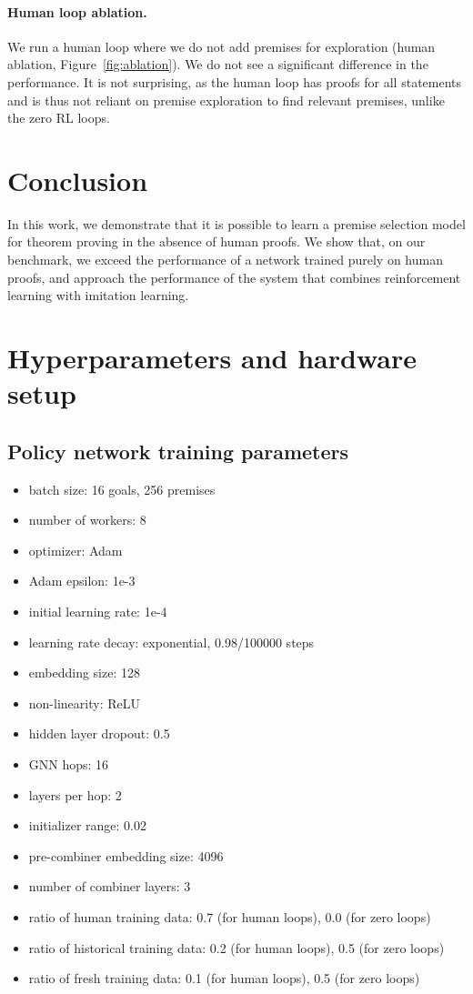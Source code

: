 \documentclass{article}
\begin{document}
\vspace{-2mm}
\paragraph{Human loop ablation.}
We run a human loop where we do not add premises for exploration 
(human ablation, Figure~\ref{fig:ablation}).
We do not see a significant difference in the performance.
It is not surprising, as the human loop has proofs for all statements and is thus not reliant on premise exploration to find relevant premises, unlike the zero RL loops.


\section{Conclusion}
In this work, we demonstrate that it is possible to learn a premise selection model for theorem proving in the absence of human proofs.
We show that, on our benchmark, we exceed the performance of a network trained purely on human proofs, and approach the performance of the system that combines reinforcement learning with imitation learning.





\newpage

\appendix

\section{Hyperparameters and hardware setup}
\subsection{Policy network training parameters}
\begin{itemize}
    \item batch size: 16 goals, 256 premises
    \item number of workers: 8
    \item optimizer: Adam
    \item Adam epsilon: 1e-3
    \item initial learning rate: 1e-4
    \item learning rate decay: exponential, 0.98/100000 steps
    \item embedding size: 128
    \item non-linearity: ReLU
    \item hidden layer dropout: 0.5
    \item GNN hops: 16
    \item layers per hop: 2
    \item initializer range: 0.02
    \item pre-combiner embedding size: 4096
    \item number of combiner layers: 3
    \item ratio of human training data: 0.7 (for human loops), 0.0 (for zero loops)
    \item ratio of historical training data: 0.2 (for human loops), 0.5 (for zero loops)
    \item ratio of fresh training data: 0.1 (for human loops), 0.5 (for zero loops)
\end{itemize}
\end{document}
